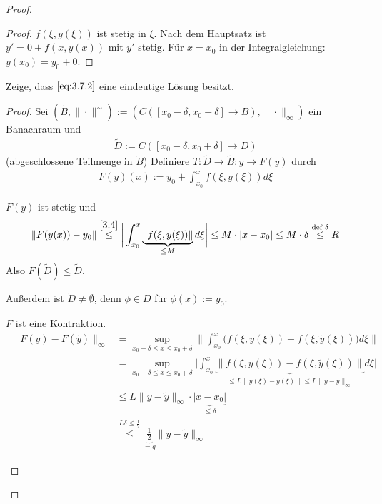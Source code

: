 \begin{theorem}
\begin{proof}
\begin{enum-arab}
\begin{proof}
						$f(\xi, y(\xi))$ ist stetig in $\xi$.
						Nach dem Hauptsatz ist $y' = 0 + f(x, y(x))$ mit $y'$ stetig.
						Für $x = x_0$ in der Integralgleichung: $y(x_0) = y_0 + 0$.
				\end{proof}
			\item
				Zeige, dass $\eqref{eq:3.7.2}$ eine eindeutige Lösung besitzt.
				\begin{proof}
					Sei $(\tilde B, \|\cdot\|^{\sim}) := (C([x_0-\delta, x_0+\delta] \to B), \|\cdot\|_\infty)$ ein Banachraum und
					\begin{align*}
						\tilde D := C([x_0 -\delta, x_0 + \delta] \to D) 
					\end{align*}
					(abgeschlossene Teilmenge in $\tilde B$)
					Definiere $T: \tilde D \to \tilde B : y \to F(y)$ durch
					\begin{align*}
						F(y)(x) := y_0 + \int_{x_0}^x f(\xi, y(\xi)) d\xi
					\end{align*}
					\begin{enum-alph}
						\item
							$F(y)$ ist stetig und
							\begin{align*}
								\|F(y(x)) - y_0 \|
								\stackrel{\ref{3.4}}\le \bigg| \int_{x_0}^x \underbrace{\|f(\xi, y(\xi))\|}_{\le M} d\xi \bigg|
								\le M \cdot |x - x_0|
								\le M \cdot \delta
								\stackrel{\text{def } \delta}\le R
							\end{align*}
							Also $F(\tilde D ) \le \tilde D$.
						\item
							Außerdem ist $\tilde D \neq \emptyset$, denn $\phi \in \tilde D$ für $\phi(x) := y_0$.
						\item
							$F$ ist eine Kontraktion.
							\begin{align*}
								\|F(y) - F(\tilde y)\|_\infty
								&= \sup_{x_0-\delta \le x \le x_0+\delta} \bigg\| \int_{x_0}^x \Big( f(\xi, y(\xi)) - f(\xi, \tilde y(\xi)) \Big) d\xi \bigg\| \\
								&= \sup_{x_0-\delta \le x \le x_0+\delta} \bigg| \int_{x_0}^x \underbrace{\Big\| f(\xi, y(\xi)) - f(\xi, \tilde y(\xi)) \Big\|}_{\le L \|y(\xi)-\tilde y(\xi)\| \le L \|y-\tilde y\|_\infty} d\xi \bigg| \\
								&\le L \|y-\tilde y\|_\infty \cdot \underbrace{|x-x_0|}_{\le \delta} \\
								&\stackrel{L \delta \le \frac 12} \le \underbrace{\frac 12}_{=q} \|y-\tilde y\|_\infty
							\end{align*}
					\end{enum-alph}

\end{proof}
\end{enum-arab}
\end{proof}
\end{theorem}
